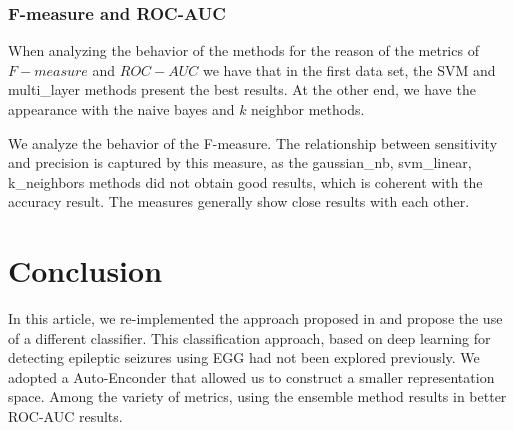 









\newpage

\subsubsection{F-measure and ROC-AUC}

When analyzing the behavior of the methods for the reason of the metrics of $ F-measure $ and $ ROC-AUC $ we have that in the first data set, the SVM and multi\_layer methods present the best results. At the other end, we have the appearance with the naive bayes and $k$ neighbor methods.

We analyze the behavior of the F-measure. The relationship between sensitivity and precision is captured by this measure, as the gaussian\_nb, svm\_linear, k\_neighbors methods did not obtain good results, which is coherent with the accuracy result. The measures generally show close results with each other. 
























\newpage

\section{Conclusion}\label{sec:concl}
In this article, we re-implemented the approach proposed in \cite{WenZha:2018} and propose the use of a different classifier. This classification approach, based on deep learning for detecting epileptic seizures using EGG had not been explored previously. We adopted a Auto-Enconder that allowed us to construct a smaller representation space. Among the variety of metrics, using the ensemble method results in better ROC-AUC results.

